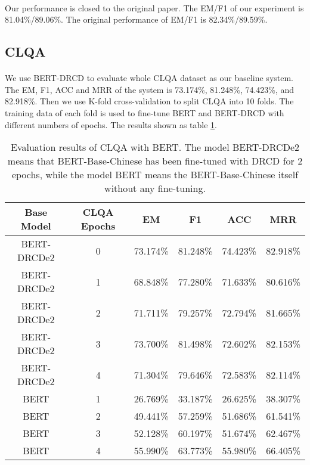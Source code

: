 \documentclass{article}
\begin{document}
\paragraph{}
Our performance is closed to the original paper. The EM/F1 of our experiment is 81.04\%/89.06\%. The original performance of EM/F1 is 82.34\%/89.59\%.

\subsection{CLQA}
\paragraph{}
We use BERT-DRCD to evaluate whole CLQA dataset as our baseline system. The EM, F1, ACC and MRR of the system is 73.174\%, 81.248\%, 74.423\%, and 82.918\%. Then we use K-fold cross-validation to split CLQA into 10 folds. The training data of each fold is used to fine-tune BERT and BERT-DRCD with different numbers of epochs. The results shown as table \ref{tab:bert-clqa}.

\begin{table}[ht!]
  \centering
  \begin{tabular}{cccccc}
    Base Model & CLQA Epochs & EM & F1 & ACC & MRR\\
    \toprule
    BERT-DRCDe2 & 0 & 73.174\% & 81.248\% & 74.423\% & 82.918\% \\
    BERT-DRCDe2 & 1 & 68.848\% & 77.280\% & 71.633\% & 80.616\% \\
    BERT-DRCDe2 & 2 & 71.711\% & 79.257\% & 72.794\% & 81.665\% \\
    BERT-DRCDe2 & 3 & 73.700\% & 81.498\% & 72.602\% & 82.153\% \\
    BERT-DRCDe2 & 4 & 71.304\% & 79.646\% & 72.583\% & 82.114\% \\
    BERT        & 1 & 26.769\% & 33.187\% & 26.625\% & 38.307\% \\
    BERT        & 2 & 49.441\% & 57.259\% & 51.686\% & 61.541\% \\
    BERT        & 3 & 52.128\% & 60.197\% & 51.674\% & 62.467\% \\
    BERT        & 4 & 55.990\% & 63.773\% & 55.980\% & 66.405\% \\
  \end{tabular}
  \caption{Evaluation results of CLQA with BERT. The model BERT-DRCDe2 means that BERT-Base-Chinese has been fine-tuned with DRCD for 2 epochs, while the model BERT means the BERT-Base-Chinese itself without any fine-tuning.}
  \label{tab:bert-clqa}
\end{table}
\end{document}

